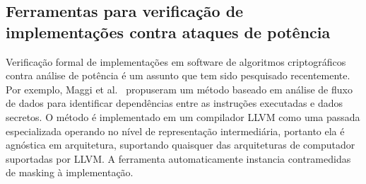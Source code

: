 \subsection{Ferramentas para verificação de implementações contra ataques de potência}




Verificação formal de implementações em software de algoritmos criptográficos contra análise de potência é um assunto que tem sido pesquisado recentemente.
%
%
Por exemplo, Maggi et al.~\cite{maggi2013automated, Agosta2013} propuseram um método baseado em análise de fluxo de dados para identificar dependências entre as instruções executadas e dados secretos.
%
%
O método é implementado em um compilador LLVM como uma passada especializada operando no nível de representação intermediária, portanto ela é agnóstica em arquitetura, suportando quaisquer das arquiteturas de computador suportadas por LLVM. A ferramenta automaticamente instancia contramedidas de masking à implementação.
%


